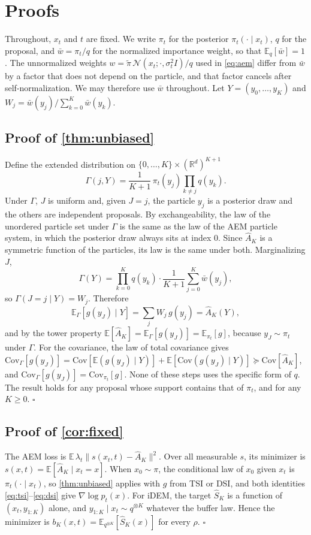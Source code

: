 \section{Proofs}
\label{app:proofs}

Throughout, $x_t$ and $t$ are fixed. We write $\pi_t$ for the posterior $\pi_t(\cdot\mid x_t)$, $q$ for the proposal, and $\bar w=\pi_t/q$ for the normalized importance weight, so that $\mathbb{E}_q[\bar w]=1$. The unnormalized weights $w=\tilde\pi\,\mathcal{N}(x_t;\cdot,\sigma_t^2I)/q$ used in \eqref{eq:aem} differ from $\bar w$ by a factor that does not depend on the particle, and that factor cancels after self-normalization. We may therefore use $\bar w$ throughout. Let $Y=(y_0,\dots,y_K)$ and $W_j=\bar w(y_j)/\sum_{k=0}^K\bar w(y_k)$.

\subsection{Proof of \cref{thm:unbiased}}
Define the extended distribution on $\{0,\dots,K\}\times(\mathbb{R}^d)^{K+1}$
\[
\Gamma(j,Y)=\frac{1}{K+1}\,\pi_t(y_j)\prod_{k\neq j}q(y_k).
\]
Under $\Gamma$, $J$ is uniform and, given $J=j$, the particle $y_j$ is a posterior draw and the others are independent proposals. By exchangeability, the law of the unordered particle set under $\Gamma$ is the same as the law of the AEM particle system, in which the posterior draw always sits at index $0$. Since $\widehat A_K$ is a symmetric function of the particles, its law is the same under both.
Marginalizing $J$,
\[
\Gamma(Y)=\prod_{k=0}^K q(y_k)\cdot\frac{1}{K+1}\sum_{j=0}^K\bar w(y_j),
\]
so $\Gamma(J=j\mid Y)=W_j$. Therefore
\[
\mathbb{E}_\Gamma[g(y_J)\mid Y]=\sum_j W_j\,g(y_j)=\widehat A_K(Y),
\]
and by the tower property $\mathbb{E}[\widehat A_K]=\mathbb{E}_\Gamma[g(y_J)]=\mathbb{E}_{\pi_t}[g]$, because $y_J\sim\pi_t$ under $\Gamma$.
For the covariance, the law of total covariance gives
$\mathrm{Cov}_\Gamma[g(y_J)]=\mathrm{Cov}[\mathbb{E}(g(y_J)\mid Y)]+\mathbb{E}[\mathrm{Cov}(g(y_J)\mid Y)]\succeq\mathrm{Cov}[\widehat A_K]$, and $\mathrm{Cov}_\Gamma[g(y_J)]=\mathrm{Cov}_{\pi_t}[g]$.
None of these steps uses the specific form of $q$. The result holds for any proposal whose support contains that of $\pi_t$, and for any $K\ge0$. \hfill$\square$

\subsection{Proof of \cref{cor:fixed}}
The AEM loss is $\mathbb{E}\,\lambda_t\|s(x_t,t)-\widehat A_K\|^2$. Over all measurable $s$, its minimizer is $s(x,t)=\mathbb{E}[\widehat A_K\mid x_t=x]$. When $x_0\sim\pi$, the conditional law of $x_0$ given $x_t$ is $\pi_t(\cdot\mid x_t)$, so \cref{thm:unbiased} applies with $g$ from TSI or DSI, and both identities \eqref{eq:tsi}--\eqref{eq:dsi} give $\nabla\log p_t(x)$. For iDEM, the target $\widehat S_K$ is a function of $(x_t,y_{1:K})$ alone, and $y_{1:K}\mid x_t\sim q^{\otimes K}$ whatever the buffer law. Hence the minimizer is $b_K(x,t)=\mathbb{E}_{q^{\otimes K}}[\widehat S_K(x)]$ for every $\rho$. \hfill$\square$

